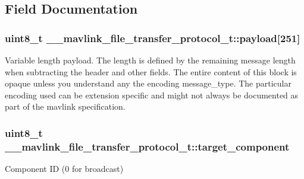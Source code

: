 \subsection{Field Documentation}
\hypertarget{struct____mavlink__file__transfer__protocol__t_ae0a8d2582f1b5e77001bf0950b21ae4a}{
\subsubsection[{payload}]{\setlength{\rightskip}{0pt plus 5cm}uint8\+\_\+t \+\_\+\+\_\+mavlink\+\_\+file\+\_\+transfer\+\_\+protocol\+\_\+t\+::payload\mbox{[}251\mbox{]}}}\label{struct____mavlink__file__transfer__protocol__t_ae0a8d2582f1b5e77001bf0950b21ae4a}


Variable length payload. The length is defined by the remaining message length when subtracting the header and other fields. The entire content of this block is opaque unless you understand any the encoding message\+\_\+type. The particular encoding used can be extension specific and might not always be documented as part of the mavlink specification. 

\hypertarget{struct____mavlink__file__transfer__protocol__t_a37711d71ad8ac75ca8be599ae78a98fb}{
\subsubsection[{target\+\_\+component}]{\setlength{\rightskip}{0pt plus 5cm}uint8\+\_\+t \+\_\+\+\_\+mavlink\+\_\+file\+\_\+transfer\+\_\+protocol\+\_\+t\+::target\+\_\+component}}\label{struct____mavlink__file__transfer__protocol__t_a37711d71ad8ac75ca8be599ae78a98fb}


Component I\+D (0 for broadcast) 

